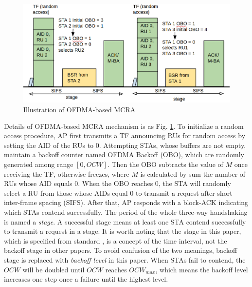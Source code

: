\documentclass[journal]{IEEEtran}
\begin{document}
\begin{figure}[!h]
\centering
\includegraphics[scale=0.26]{./figure/RA_illu.png}
\caption{Illustration of OFDMA-based MCRA}
\label{fig_ra_illu}
\end{figure}
Details of OFDMA-based MCRA mechanism is as Fig. \ref{fig_ra_illu}. 
To initialize a random access procedure, AP first transmits a TF announcing RUs for random access by setting the AID of the RUs to 0. 
Attempting STAs, whose buffers are not empty, maintain a backoff counter named OFDMA Backoff (OBO), which are randomly generated among range $[0, OCW]$.
Then the OBO subtracts the value of $M$ once receiving the TF, otherwise freezes, where $M$ is calculated by sum the number of RUs whose AID equals 0.  
When the OBO reaches 0, the STA will randomly select a RU from those whose AIDs equal 0 to transmit a request after short inter-frame spacing (SIFS). 
After that, AP responds with a block-ACK indicating which STAs contend successfully. The period of the whole three-way handshaking is named a \textit{stage}.
A successful stage means at least one STA contend successfully to transmit a request in a stage. 
It is worth noting that the stage in this paper, which is specified from standard \cite{draft_ax}, is a concept of the time interval, not the backoff stage in other papers.
To avoid confusion of the two meanings, backoff stage is replaced with \textit{backoff level} in this paper.  
When STAs fail to contend, the $OCW$ will be doubled until $OCW$ reaches $OCW_{max}$, which means the backoff level increases one step once a failure until the highest level.
\end{document}

